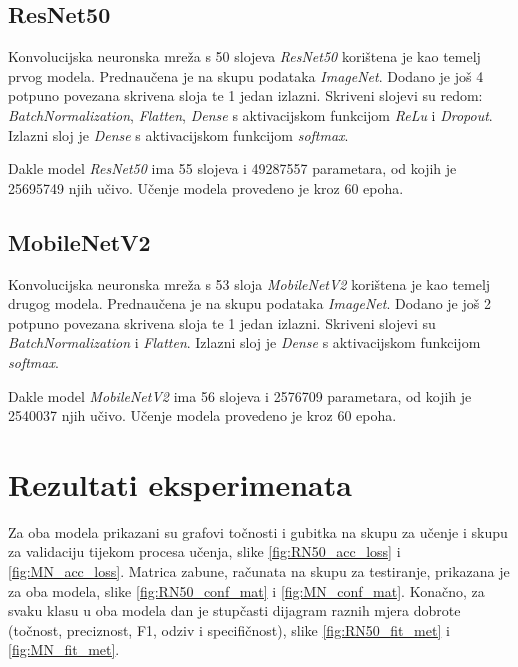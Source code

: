\documentclass[conference, utf8]{IEEEtran}
\begin{document}
\subsection{ResNet50}
Konvolucijska neuronska mreža s 50 slojeva \textit{ResNet50} korištena je kao temelj prvog modela. Prednaučena je na skupu podataka \textit{ImageNet}. Dodano je još 4 potpuno povezana skrivena sloja te 1 jedan izlazni. Skriveni slojevi su redom: \textit{BatchNormalization}, \textit{Flatten}, \textit{Dense} s aktivacijskom funkcijom \textit{ReLu} i \textit{Dropout}. Izlazni sloj je \textit{Dense} s aktivacijskom funkcijom \textit{softmax}.

Dakle model \textit{ResNet50} ima 55 slojeva i 49287557 parametara, od kojih je 25695749 njih učivo. Učenje modela provedeno je kroz 60 epoha.


\subsection{MobileNetV2}
Konvolucijska neuronska mreža s 53 sloja \textit{MobileNetV2} korištena je kao temelj drugog modela. Prednaučena je na skupu podataka \textit{ImageNet}. Dodano je još 2 potpuno povezana skrivena sloja te 1 jedan izlazni. Skriveni slojevi su  \textit{BatchNormalization} i \textit{Flatten}. Izlazni sloj je \textit{Dense} s aktivacijskom funkcijom \textit{softmax}.

Dakle model \textit{MobileNetV2} ima 56 slojeva i 2576709 parametara, od kojih je 2540037 njih učivo. Učenje modela provedeno je kroz 60 epoha.



\section{Rezultati eksperimenata}
Za oba modela prikazani su grafovi točnosti i gubitka na skupu za učenje i skupu za validaciju tijekom procesa učenja, slike \ref{fig:RN50_acc_loss} i \ref{fig:MN_acc_loss}. Matrica zabune, računata na skupu za testiranje, prikazana je za oba modela, slike \ref{fig:RN50_conf_mat} i \ref{fig:MN_conf_mat}. Konačno, za svaku klasu u oba modela dan je stupčasti dijagram raznih mjera dobrote (točnost, preciznost, F1, odziv i specifičnost), slike \ref{fig:RN50_fit_met} i \ref{fig:MN_fit_met}.
\end{document}
